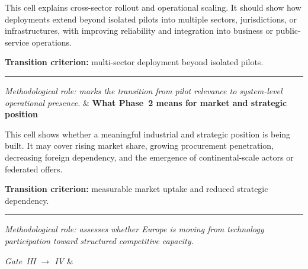 \documentclass[10pt,a4paper]{article}
\newcommand{\kpistrip}[1]{%
  \par\vspace{2pt}\noindent\rule{\linewidth}{0.2pt}%
  \par\noindent\textit{\scriptsize #1}}
\newcommand{\cellhead}[1]{\textbf{#1}\par\smallskip}
\newcommand{\gatelbl}[1]{\scriptsize\textit{Gate~#1}}
\begin{document}
\begin{landscape}
\begin{longtable}
This cell explains cross-sector rollout and operational scaling. It should show
how deployments extend beyond isolated pilots into multiple sectors,
jurisdictions, or infrastructures, with improving reliability and integration into
business or public-service operations.
\par\smallskip\textbf{Transition criterion:} multi-sector deployment beyond isolated pilots.
\kpistrip{Methodological role: marks the transition from pilot relevance to
system-level operational presence.}
&
\cellhead{What Phase~2 means for market and strategic position}
This cell shows whether a meaningful industrial and strategic position is being
built. It may cover rising market share, growing procurement penetration,
decreasing foreign dependency, and the emergence of continental-scale actors or
federated offers.
\par\smallskip\textbf{Transition criterion:} measurable market uptake and reduced strategic dependency.
\kpistrip{Methodological role: assesses whether Europe is moving from technology
participation toward structured competitive capacity.}
\\
\hline

\gatelbl{III $\rightarrow$ IV} &
\\
\hline


\end{longtable}
\end{landscape}
\end{document}
